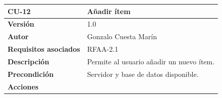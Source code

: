 \documentclass[
]{article}
\begin{document}
\begin{longtable}[]{@{}ll@{}}
\toprule
\begin{minipage}[b]{0.15\columnwidth}\raggedright
\textbf{CU-12}\strut
\end{minipage} & \begin{minipage}[b]{0.79\columnwidth}\raggedright
\textbf{Añadir ítem}\strut
\end{minipage}\tabularnewline
\midrule
\endhead
\begin{minipage}[t]{0.15\columnwidth}\raggedright
\textbf{Versión}\strut
\end{minipage} & \begin{minipage}[t]{0.79\columnwidth}\raggedright
1.0\strut
\end{minipage}\tabularnewline
\begin{minipage}[t]{0.15\columnwidth}\raggedright
\textbf{Autor}\strut
\end{minipage} & \begin{minipage}[t]{0.79\columnwidth}\raggedright
Gonzalo Cuesta Marín\strut
\end{minipage}\tabularnewline
\begin{minipage}[t]{0.15\columnwidth}\raggedright
\textbf{Requisitos asociados}\strut
\end{minipage} & \begin{minipage}[t]{0.79\columnwidth}\raggedright
RFAA-2.1\strut
\end{minipage}\tabularnewline
\begin{minipage}[t]{0.15\columnwidth}\raggedright
\textbf{Descripción}\strut
\end{minipage} & \begin{minipage}[t]{0.79\columnwidth}\raggedright
Permite al usuario añadir un nuevo ítem.\strut
\end{minipage}\tabularnewline
\begin{minipage}[t]{0.15\columnwidth}\raggedright
\textbf{Precondición}\strut
\end{minipage} & \begin{minipage}[t]{0.79\columnwidth}\raggedright
Servidor y base de datos disponible.\strut
\end{minipage}\tabularnewline
\begin{minipage}[t]{0.15\columnwidth}\raggedright
\textbf{Acciones}\strut
\end{minipage} & \begin{minipage}[t]{0.79\columnwidth}\raggedright
\begin{enumerate}
\def\labelenumi{\arabic{enumi}.}

\end{enumerate}
\end{minipage}
\end{longtable}
\end{document}
